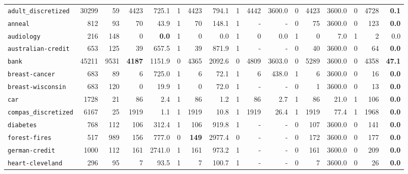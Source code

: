 \begin{tabular}{lccrrrrrrrrrrrrrr}
\texttt{adult\_discretized} & \multicolumn{1}{r}{30299} & \multicolumn{1}{r}{59}  & 4423 & 725.1 & 1 & 4423 & 794.1 & 1 & 4442 & 3600.0 & 0 & 4423 & 3600.0 & 0 & 4728 & \textbf{0.1}\\
\texttt{anneal} & \multicolumn{1}{r}{812} & \multicolumn{1}{r}{93}  & 70 & 43.9 & 1 & 70 & 148.1 & 1 & - & - & 0 & 75 & 3600.0 & 0 & 123 & \textbf{0.0}\\
\texttt{audiology} & \multicolumn{1}{r}{216} & \multicolumn{1}{r}{148}  & 0 & \textbf{0.0} & 1 & 0 & 0.0 & 1 & 0 & 0.0 & 1 & 0 & 7.0 & 1 & 2 & 0.0\\
\texttt{australian-credit} & \multicolumn{1}{r}{653} & \multicolumn{1}{r}{125}  & 39 & 657.5 & 1 & 39 & 871.9 & 1 & - & - & 0 & 40 & 3600.0 & 0 & 64 & \textbf{0.0}\\
\texttt{bank} & \multicolumn{1}{r}{45211} & \multicolumn{1}{r}{9531}  & \textbf{4187} & 1151.9 & 0 & 4365 & 2092.6 & 0 & 4809 & 3603.0 & 0 & 5289 & 3600.0 & 0 & 4358 & \textbf{47.1}\\
\texttt{breast-cancer} & \multicolumn{1}{r}{683} & \multicolumn{1}{r}{89}  & 6 & 725.0 & 1 & 6 & 72.1 & 1 & 6 & 438.0 & 1 & 6 & 3600.0 & 0 & 16 & \textbf{0.0}\\
\texttt{breast-wisconsin} & \multicolumn{1}{r}{683} & \multicolumn{1}{r}{120}  & 0 & 19.9 & 1 & 0 & 72.0 & 1 & - & - & 0 & 1 & 3600.0 & 0 & 13 & \textbf{0.0}\\
\texttt{car} & \multicolumn{1}{r}{1728} & \multicolumn{1}{r}{21}  & 86 & 2.4 & 1 & 86 & 1.2 & 1 & 86 & 2.7 & 1 & 86 & 21.0 & 1 & 106 & \textbf{0.0}\\
\texttt{compas\_discretized} & \multicolumn{1}{r}{6167} & \multicolumn{1}{r}{25}  & 1919 & 1.1 & 1 & 1919 & 10.8 & 1 & 1919 & 26.4 & 1 & 1919 & 77.4 & 1 & 1968 & \textbf{0.0}\\
\texttt{diabetes} & \multicolumn{1}{r}{768} & \multicolumn{1}{r}{112}  & 106 & 312.4 & 1 & 106 & 919.8 & 1 & - & - & 0 & 107 & 3600.0 & 0 & 141 & \textbf{0.0}\\
\texttt{forest-fires} & \multicolumn{1}{r}{517} & \multicolumn{1}{r}{989}  & 156 & 777.0 & 0 & \textbf{149} & 2977.4 & 0 & - & - & 0 & 172 & 3600.0 & 0 & 177 & \textbf{0.0}\\
\texttt{german-credit} & \multicolumn{1}{r}{1000} & \multicolumn{1}{r}{112}  & 161 & 2741.0 & 1 & 161 & 973.2 & 1 & - & - & 0 & 161 & 3600.0 & 0 & 209 & \textbf{0.0}\\
\texttt{heart-cleveland} & \multicolumn{1}{r}{296} & \multicolumn{1}{r}{95}  & 7 & 93.5 & 1 & 7 & 100.7 & 1 & - & - & 0 & 7 & 3600.0 & 0 & 26 & \textbf{0.0}\\

\end{tabular}
